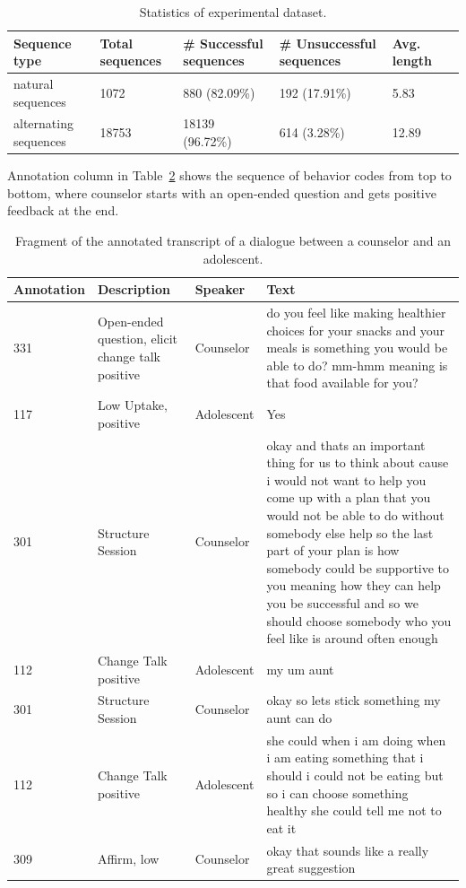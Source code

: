 \documentclass{amia}
\begin{document}
\begin{table}[h]
\centering
\caption{Statistics of experimental dataset.}
\label{tab:data_dist}
  \begin{tabular}{|l|l|l|l|l|l|}
  \hline
   \textbf{Sequence type} & \textbf{Total sequences}  & \textbf{\# Successful sequences}  & \textbf{\# Unsuccessful sequences} & \textbf{Avg. length} \\ \hline      
 natural sequences & 1072 & 880 (82.09\%) & 192 (17.91\%) & 5.83 \\\hline
alternating sequences & 18753 & 18139 (96.72\%) & 614 (3.28\%) & 12.89 \\\hline 
  \end{tabular}
\end{table} 

Annotation column in Table~\ref{tab:anno_examp} shows the sequence of behavior codes from top to bottom, where counselor starts with an open-ended question and gets positive feedback at the end. \\

\begin{table}[h]
\caption{Fragment of the annotated transcript of a dialogue between a counselor and an adolescent.}    
\label{tab:anno_examp}
\centering
\begin{tabular}{|l|p{3.6cm}|l|p{8cm}|}
\hline
Annotation  & Description & Speaker & Text \\\hline
331 &	Open-ended question, elicit change talk positive &	Counselor &	do you feel like making healthier choices for your snacks and your meals is something you would be able to do? mm-hmm meaning is that food available for you? \\\hline
117 &	Low Uptake, positive	& Adolescent &	Yes \\\hline
301 &	Structure Session	& Counselor &	okay and thats an important thing for us to think about cause i would not want to help you come up with a plan that you would not be able to do without somebody else help so the last part of your plan is how somebody could be supportive to you meaning how they can help you be successful and so we should choose somebody who you feel like is around often enough \\\hline
112 &	Change Talk positive	& Adolescent &	my um aunt \\\hline
301 &	Structure Session	& Counselor &	okay so lets stick something my aunt can do \\\hline
112 &	Change Talk positive &	Adolescent &	she could when i am doing when i am eating something that i should i could not be eating but so i can choose something healthy she could tell me not to eat it \\\hline
309 &	Affirm, low &	Counselor &	okay that sounds like a really great suggestion \\\hline
\end{tabular}
\end{table}  
\end{document}
